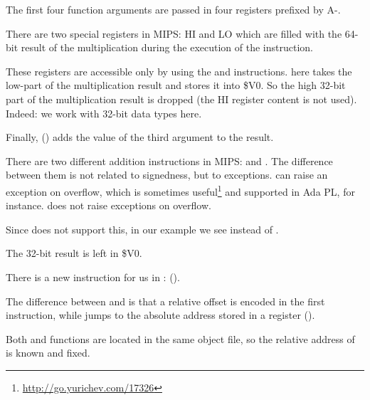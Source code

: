 


The first four function arguments are passed in four registers prefixed by A-.


There are two special registers in MIPS: HI and LO which are filled with the 64-bit result of the multiplication during the execution of the  instruction.

These registers are accessible only by using the  and  instructions.
 here takes the low-part of the multiplication result and stores it into \$V0.
So the high 32-bit part of the multiplication result is dropped (the HI register content is not used).
Indeed: we work with 32-bit \Tint data types here.


Finally,  () adds the value of the third argument to the result.


There are two different addition instructions in MIPS:  and .
The difference between them is not related to signedness, but to exceptions.  can raise an exception on overflow, which is sometimes useful\footnote{\url{http://go.yurichev.com/17326}} and supported in Ada \ac{PL}, for instance.
 does not raise exceptions on overflow.

Since \CCpp does not support this, in our example we see  instead of .

The 32-bit result is left in \$V0.


There is a new instruction for us in \main:  (). 

The difference between  and  is that a relative offset is encoded in the first instruction, 
while  jumps to the absolute address stored in a register ().

Both \ttf and \main functions are located in the same object file, so the relative address of \ttf 
is known and fixed.
